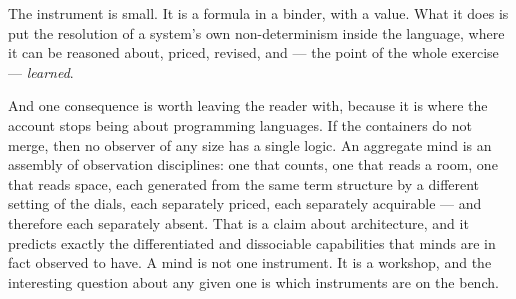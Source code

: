 The instrument is small. It is a formula in a binder, with a value. What it does
is put the resolution of a system's own non-determinism inside the language, where
it can be reasoned about, priced, revised, and --- the point of the whole exercise
--- \emph{learned}.

And one consequence is worth leaving the reader with, because it is where the
account stops being about programming languages. If the containers do not merge,
then no observer of any size has a single logic. An aggregate mind is an assembly
of observation disciplines: one that counts, one that reads a room, one that reads
space, each generated from the same term structure by a different setting of the
dials, each separately priced, each separately acquirable --- and therefore each
separately absent. That is a claim about architecture, and it predicts exactly the
differentiated and dissociable capabilities that minds are in fact observed to
have. A mind is not one instrument. It is a workshop, and the interesting question
about any given one is which instruments are on the bench.
